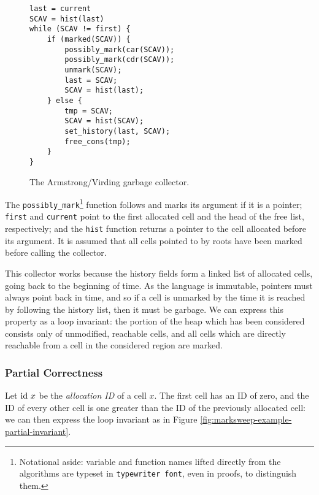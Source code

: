 \begin{figure}[t]
  \centering
  \begin{lstlisting}
last = current
SCAV = hist(last)
while (SCAV != first) {
    if (marked(SCAV)) {
        possibly_mark(car(SCAV));
        possibly_mark(cdr(SCAV));
        unmark(SCAV);
        last = SCAV;
        SCAV = hist(last);
    } else {
        tmp = SCAV;
        SCAV = hist(SCAV);
        set_history(last, SCAV);
        free_cons(tmp);
    }
}
  \end{lstlisting}
  \captionsetup{format=default}
  \caption{The Armstrong/Virding garbage collector.}
  \label{fig:marksweep-example-algo}
\end{figure}

The \texttt{possibly\_mark}\footnote{Notational aside: variable and
  function names lifted directly from the algorithms are typeset in
  \texttt{typewriter font}, even in proofs, to distinguish them.}
function follows and marks its argument if it is a pointer;
\texttt{first} and \texttt{current} point to the first allocated cell
and the head of the free list, respectively; and the \texttt{hist}
function returns a pointer to the cell allocated before its
argument. It is assumed that all cells pointed to by roots have been
marked before calling the collector.

This collector works because the history fields form a linked list of
allocated cells, going back to the beginning of time. As the language
is immutable, pointers must always point back in time, and so if a
cell is unmarked by the time it is reached by following the history
list, then it must be garbage. We can express this property as a loop
invariant: the portion of the heap which has been considered consists
only of unmodified, reachable cells, and all cells which are directly
reachable from a cell in the considered region are marked.

\subsubsection{Partial Correctness}
\label{sec:marksweep-example-partial}

Let $\mathrm{id}~x$ be the \textit{allocation ID} of a cell $x$. The first
cell has an ID of zero, and the ID of every other cell is one greater
than the ID of the previously allocated cell: we can then express the
loop invariant as in Figure
\ref{fig:marksweep-example-partial-invariant}.


